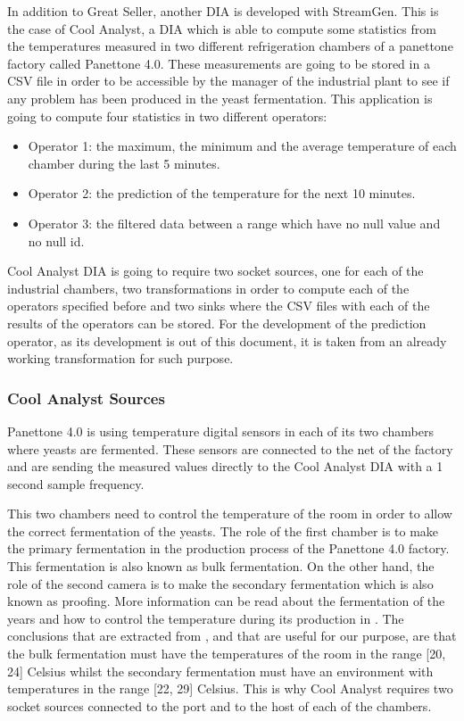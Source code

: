 In addition to Great Seller, another DIA is developed with StreamGen. This is the case of Cool Analyst, a DIA which is able to compute some statistics from the temperatures measured in two different refrigeration chambers of a panettone factory called Panettone 4.0. These measurements are going to be stored in a CSV file in order to be accessible by the manager of the industrial plant to see if any problem has been produced in the yeast fermentation. This application is going to compute four statistics in two different operators:

\begin{itemize}
\item Operator 1: the maximum, the minimum and the average temperature of each chamber during the last 5 minutes.
\item Operator 2: the prediction of the temperature for the next 10 minutes.
\item Operator 3: the filtered data between a range which have no null value and no null id.
\end{itemize}

Cool Analyst DIA is going to require two socket sources, one for each of the industrial chambers, two transformations in order to compute each of the operators specified before and two sinks where the CSV files with each of the results of the operators can be stored. For the development of the prediction operator, as its development is out of this document, it is taken from an already working transformation for such purpose.

\subsubsection*{Cool Analyst Sources}

Panettone 4.0 is using temperature digital sensors in each of its two chambers where yeasts are fermented. These sensors are connected to the net of the factory and are sending the measured values directly to the Cool Analyst DIA with a 1 second sample frequency.

This two chambers need to control the temperature of the room in order to allow the correct fermentation of the yeasts. The role of the first chamber is to make the primary fermentation in the production process of the Panettone 4.0 factory. This fermentation is also known as bulk fermentation. On the other hand, the role of the second camera is to make the secondary fermentation which is also known as proofing. More information can be read about the fermentation of the years and how to control the temperature during its production in \cite{yeastfermentation}. The conclusions that are extracted from \cite{yeastfermentation}, and that are useful for our purpose, are that the bulk fermentation must have the temperatures of the room in the range [20, 24] Celsius whilst the secondary fermentation must have an environment with temperatures in the range [22, 29] Celsius. This is why Cool Analyst requires two socket sources connected to the port and to the host of each of the chambers.

